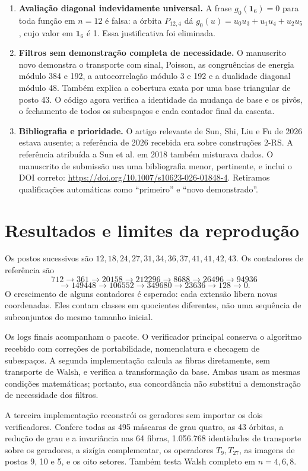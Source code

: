 \documentclass[11pt,a4paper]{article}
\begin{document}
\begin{enumerate}
\item \textbf{Avaliação diagonal indevidamente universal.}
A frase $g_0(\mathbf1_6)=0$ para toda função em $n=12$ é falsa:
a órbita $P_{12,4}$ dá $g_0(u)=u_0u_3+u_1u_4+u_2u_5$, cujo valor
em $\mathbf1_6$ é 1. Essa justificativa foi eliminada.

\item \textbf{Filtros sem demonstração completa de necessidade.}
O manuscrito novo demonstra o transporte com sinal, Poisson,
as congruências de energia módulo 384 e 192, a autocorrelação
módulo 3 e 192 e a dualidade diagonal módulo 48.
Também explica a cobertura exata por uma base triangular de posto 43.
O código agora verifica a identidade da mudança de base e os pivôs,
o fechamento de todos os subespaços e cada contador final da cascata.

\item \textbf{Bibliografia e prioridade.}
O artigo relevante de Sun, Shi, Liu e Fu de 2026 estava ausente;
a referência de 2026 recebida era sobre construções 2-RS.
A referência atribuída a Sun et al. em 2018 também misturava dados.
O manuscrito de submissão usa uma bibliografia menor, pertinente,
e inclui o DOI correto: \url{https://doi.org/10.1007/s10623-026-01848-4}.
Retiramos qualificações automáticas como ``primeiro'' e ``novo demonstrado''.
\end{enumerate}

\section{Resultados e limites da reprodução}
Os postos sucessivos são
$12,18,24,27,31,34,36,37,41,41,42,43$.
Os contadores de referência são
\[
712\to361\to20158\to212296\to8688\to26496\to94936
\]
\[
\to149448\to106552\to349680\to23636\to128\to0.
\]
O crescimento de alguns contadores é esperado: cada extensão libera
novas coordenadas. Eles contam classes em quocientes diferentes,
não uma sequência de subconjuntos do mesmo tamanho inicial.

Os logs finais acompanham o pacote. O verificador principal conserva
o algoritmo recebido com correções de portabilidade, nomenclatura e
checagem de subespaços. A segunda implementação calcula as fibras
diretamente, sem transporte de Walsh, e verifica a transformação da base.
Ambas usam as mesmas condições matemáticas; portanto, sua concordância
não substitui a demonstração de necessidade dos filtros.

A terceira implementação reconstrói os geradores sem importar os dois
verificadores. Confere todas as 495 máscaras de grau quatro, as 43 órbitas,
a redução de grau e a invariância nas 64 fibras, 1.056.768 identidades
de transporte sobre os geradores, a sizígia complementar, os operadores
$T_9,T_{27}$, as imagens de postos 9, 10 e 5, e os oito setores.
Também testa Walsh completo em $n=4,6,8$.
\end{document}
